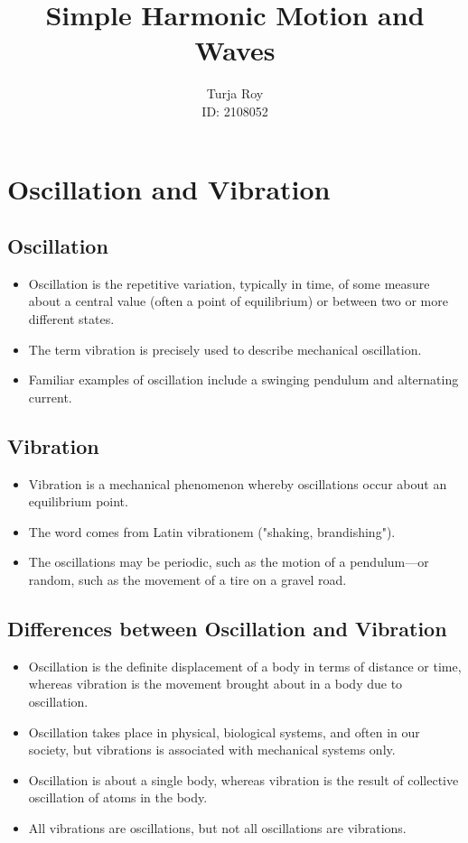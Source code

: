 \documentclass[12pt]{article}
\title{
    \textbf{Simple Harmonic Motion and Waves}
}
\author{
    Turja Roy\\
    ID: 2108052
}
\date{}
\numberwithin{equation}{subsection}
\begin{document}
\maketitle
\tableofcontents
\newpage

\section{Oscillation and Vibration}
\subsection{Oscillation}
\begin{itemize}
    \item Oscillation is the repetitive variation, typically in time, of some measure about a central value (often a point of equilibrium) or between two or more different states.
    \item The term vibration is precisely used to describe mechanical oscillation.
    \item Familiar examples of oscillation include a swinging pendulum and alternating current.
\end{itemize}

\subsection{Vibration}
\begin{itemize}
    \item Vibration is a mechanical phenomenon whereby oscillations occur about an equilibrium point.
    \item The word comes from Latin vibrationem ("shaking, brandishing").
    \item The oscillations may be periodic, such as the motion of a pendulum—or random, such as the movement of a tire on a gravel road.
\end{itemize}

\subsection{Differences between Oscillation and Vibration}
\begin{itemize}
    \item Oscillation is the definite displacement of a body in terms of distance or time, whereas vibration is the movement brought about in a body due to oscillation.
    \item Oscillation takes place in physical, biological systems, and often in our society, but vibrations is associated with mechanical systems only.
    \item Oscillation is about a single body, whereas vibration is the result of collective oscillation of atoms in the body.
    \item All vibrations are oscillations, but not all oscillations are vibrations.
\end{itemize}
\end{document}
